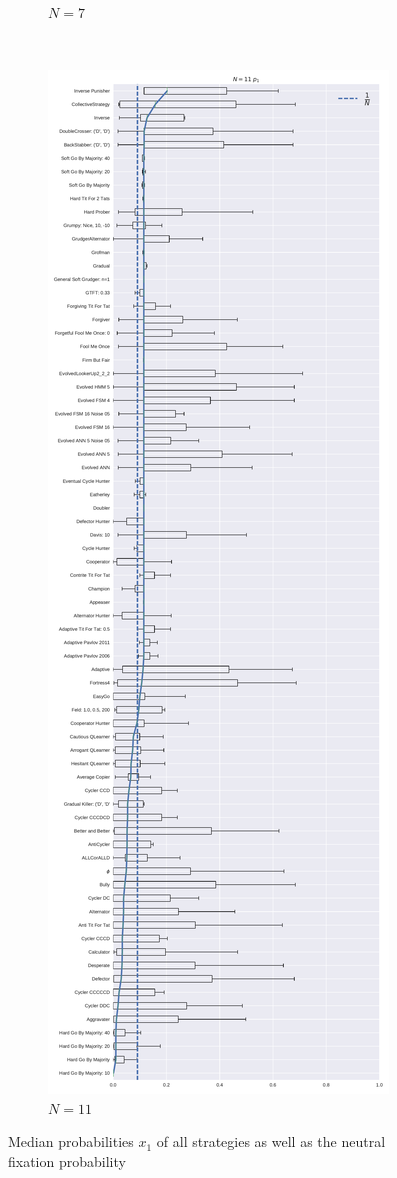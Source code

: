 \documentclass{article}
\begin{document}
\begin{figure}[!hbtp]
\begin{subfigure}[t]{.3\textwidth}
        \caption{\(N=7\)}
    \end{subfigure}%
    ~
    \begin{subfigure}[t]{.3\textwidth}
        \centering
        \includegraphics[width=\textwidth]{../img/boxplot_11_invade.pdf}
        \caption{\(N=11\)}
    \end{subfigure}%

    \caption{Median probabilities \(x_{1}\) of all strategies as well as the
    neutral fixation probability}
    \label{fig:fixation_boxplot_invade}
\end{figure}
\end{document}
